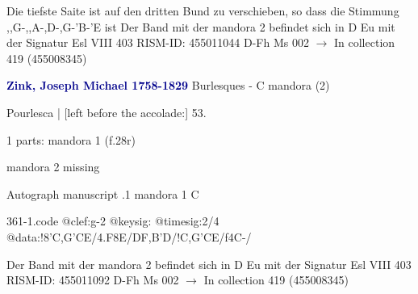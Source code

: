 \documentclass[twocolumn]{book}
\begin{document}
\newline Die tiefste Saite ist auf den dritten Bund zu verschieben, so dass die Stimmung ,,G-,,A-,D-,G-'B-'E ist
\newline Der Band mit der mandora 2 befindet sich in D Eu mit der Signatur Esl VIII 403
\newline RISM-ID: 455011044
\newline D-Fh  Ms 002
\newline $\rightarrow$ In collection 419 (455008345)
      
\newline \par \vspace{7pt} \textcolor{darkblue}{\textbf{Zink, Joseph Michael  1758-1829}}
\newline Burlesques - C
\newline mandora (2)
\newline \begin{itshape}[f.28r, at left:] Pourlesca | [left before the accolade:] 53.\end{itshape} 
\newline \textcolor{darkblue}{}  1 parts: mandora 1  (f.28r)
\newline \begin{small} mandora 2 missing\end{small} 
\newline Autograph manuscript
.1  mandora 1  C  
\begin{filecontents*}{361-1.code}
@clef:g-2
@keysig:
@timesig:2/4
@data:!8'C,G'CE/4.F8E/DF{,B'D}/!C,G'CE/f4C-/
\end{filecontents*}
\newline
%

\newline Der Band mit der mandora 2 befindet sich in D Eu mit der Signatur Esl VIII 403
\newline RISM-ID: 455011092
\newline D-Fh  Ms 002
\newline $\rightarrow$ In collection 419 (455008345)
      
\end{document}
